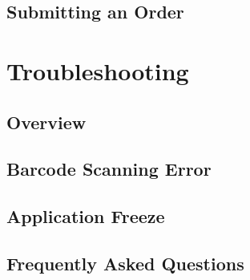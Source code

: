 \documentclass[12pt, titlepage]{article}
\begin{document}
\subsection{Submitting an Order}

\section{Troubleshooting}
\subsection{Overview}
\subsection{Barcode Scanning Error}
\subsection{Application Freeze}
\subsection{Frequently Asked Questions}
\end{document}
